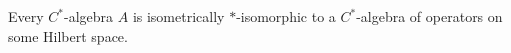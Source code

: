 Every $C^*$-algebra $A$ is isometrically $\ast$-isomorphic to a $C^*$-algebra of operators on some Hilbert space.
